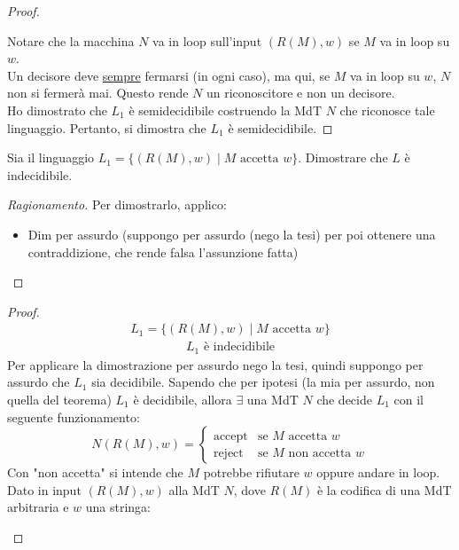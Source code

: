 \documentclass{article}  %
\theoremstyle{definition}
\newenvironment{ragionamento}[1][]
  {\begin{proof}[Ragionamento#1]\renewcommand{\qedsymbol}{}\normalfont}
  {\end{proof}}
\begin{document}
\begin{esercizio}[Esercizio 2.1]
\begin{proof}
\begin{enumerate}
\begin{itemize}
    \end{itemize}
  \end{enumerate}
  Notare che la macchina $N$ va in loop sull'input $(R(M),w)$ se $M$ va in loop su $w$. \\
  Un decisore deve \underline{sempre} fermarsi (in ogni caso), ma qui, se $M$ va in loop su $w$, $N$ non si fermerà mai. 
  Questo rende $N$ un riconoscitore e non un decisore. \\
  Ho dimostrato che $L_1$ è semidecidibile costruendo la MdT $N$ che riconosce tale linguaggio.
  Pertanto, si dimostra che $L_1$ è semidecidibile.
 \end{proof}
\end{esercizio}

\begin{esercizio}[Esercizio 2.2]
\footnotesize %
Sia il linguaggio $L_1 = \{(R(M), w) \mid M \text{ accetta } w\}$. Dimostrare che $L$ è indecidibile.
\begin{ragionamento}
Per dimostrarlo, applico:
\begin{itemize}
  \item Dim per assurdo (suppongo per assurdo (nego la tesi) per poi ottenere una contraddizione, che rende falsa l'assunzione fatta)
\end{itemize}
\end{ragionamento}
\begin{proof}
\begin{align*}
  L_1 = \{(R(M), w) \mid M \text{ accetta } w\} \tag*{(ipotesi)}
\end{align*}
\begin{align*}
  L_1 \text{ è indecidibile} \tag*{(tesi)}
\end{align*}
Per applicare la dimostrazione per assurdo nego la tesi, quindi suppongo per assurdo che $L_1$ sia decidibile.
  Sapendo che per ipotesi (la mia per assurdo, non quella del teorema) $L_1$ è decidibile, allora $\exists$ una MdT $N$ che decide $L_1$ con il seguente funzionamento:
\[
N(R(M),w) =
\begin{cases}
\text{accept} & \text{se } M \text{ accetta } w\\
\text{reject} & \text{se } M \text{ non accetta } w
\end{cases}
\]
Con "non accetta" si intende che $M$ potrebbe rifiutare $w$ oppure andare in loop.\\
  Dato in input $(R(M),w)$ alla MdT $N$, dove $R(M)$ è la codifica di una MdT arbitraria e $w$ una stringa:
  \begin{enumerate}

\end{enumerate}
\end{proof}
\end{esercizio}
\end{document}
